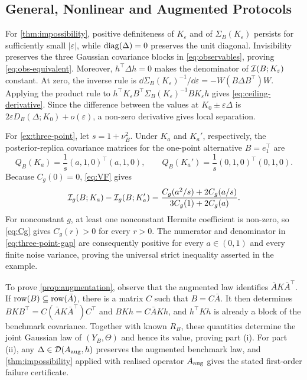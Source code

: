\subsection{General, Nonlinear and Augmented Protocols}

For \cref{thm:impossibility}, positive definiteness of $K_\varepsilon$ and
of $\Sigma_B(K_\varepsilon)$ persists for sufficiently small
$|\varepsilon|$, while $\operatorname{diag}(\Delta)=0$ preserves the unit diagonal.
Invisibility preserves the three Gaussian covariance blocks in
\eqref{eq:observables}, proving \eqref{eq:obs-equivalent}. Moreover,
$h^\top\Delta h=0$ makes the denominator of
$\mathcal{I}(B;K_\varepsilon)$ constant. At zero, the inverse rule is
$\dd\Sigma_B(K_\varepsilon)^{-1}/\dd\varepsilon
=-W(B\Delta B^\top)W$. Applying the product rule to
$h^\top K_\varepsilon B^\top\Sigma_B(K_\varepsilon)^{-1}
BK_\varepsilon h$ gives \eqref{eq:ceiling-derivative}. Since the difference
between the values at $K_0\pm\varepsilon\Delta$ is
$2\varepsilon D_B(\Delta;K_0)+o(\varepsilon)$, a non-zero derivative gives
local separation.

For \cref{ex:three-point}, let $s=1+\nu_B^2$. Under $K_a$ and $K_a'$,
respectively, the posterior-replica covariance matrices for the one-point
alternative $B=e_1^\top$ are
\begin{equation*}
Q_B(K_a)=\frac1s(a,1,0)^\top(a,1,0),
\qquad
Q_B(K_a')=\frac1s(0,1,0)^\top(0,1,0).
\end{equation*}
Because $C_g(0)=0$, \eqref{eq:VF} gives
\begin{equation}
\mathcal{I}_g(B;K_a)-\mathcal{I}_g(B;K_a')
=\frac{C_g(a^2/s)+2C_g(a/s)}{3C_g(1)+2C_g(a)}.
\label{eq:three-point-gap}
\end{equation}
For nonconstant $g$, at least one nonconstant Hermite coefficient is non-zero,
so \eqref{eq:Cg} gives $C_g(r)>0$ for every $r>0$. The numerator and denominator
in \eqref{eq:three-point-gap} are consequently
positive for every $a\in(0,1)$ and every finite noise variance, proving the
universal strict inequality asserted in the example.

To prove \cref{prop:augmentation}, observe that the augmented law identifies
$\bar AK\bar A^\top$. If
$\operatorname{row}(B)\subseteq\operatorname{row}(\bar A)$, there is a matrix $C$ such that
$B=C\bar A$. It then determines
$BKB^\top=C(\bar AK\bar A^\top)C^\top$ and $BKh=C\bar AKh$,
and $h^\top Kh$ is already a block of the benchmark covariance. Together with
known $R_B$, these quantities determine the joint Gaussian law of
$(Y_B,\Theta)$ and hence its value, proving part (i). For part (ii), any
$\Delta\in\mathcal{D}(A_{\rm aug},h)$ preserves the augmented benchmark law, and
\cref{thm:impossibility} applied with realised operator $A_{\rm aug}$ gives
the stated first-order failure certificate.

